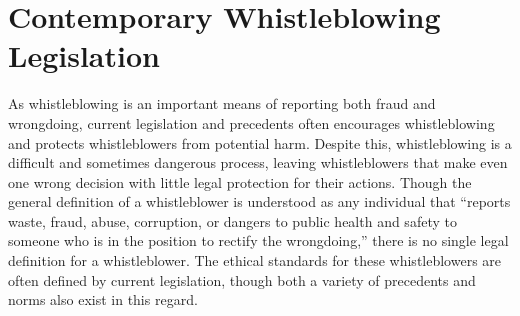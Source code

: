 \documentclass [12 pt] {article}
\begin{document}
\section{Contemporary Whistleblowing Legislation}
As whistleblowing is an important means of reporting both fraud and wrongdoing, current legislation and precedents often encourages whistleblowing and protects whistleblowers from potential harm. Despite this, whistleblowing is a difficult and sometimes dangerous process, leaving whistleblowers that make even one wrong decision with little legal protection for their actions. Though the general definition of a whistleblower is understood as any individual that ``reports waste, fraud, abuse, corruption, or dangers to public health and safety to someone who is in the position to rectify the wrongdoing,'' there is no single legal definition for a whistleblower. The ethical standards for these whistleblowers are often defined by current legislation, though both a variety of precedents and norms also exist in this regard.
\bigbreak
\end{document}
